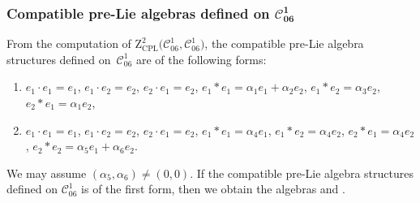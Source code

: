 \documentclass[10pt,a4paper]{amsart}
\numberwithin{equation}{section}
\begin{document}
\subsubsection[Compatible pre-Lie algebras defined on C\_\{06\}\^{}1]{Compatible pre-Lie algebras defined on $\boldsymbol{\mathcal{C}_{06}^{1}}$}

From the computation of $\mathrm{Z}_{\mathrm{CPL}}^{2}\bigl(\mathcal{C}_{06}^{1},%
\mathcal{C}_{06}^{1}\bigr)$, the compatible pre-Lie algebra structures defined on~$\mathcal{C}_{06}^{1}$ are of the following forms:
\begin{enumerate}\itemsep=0pt
\item[(1)] $e_{1}\cdot e_{1}=e_{1}$, $e_{1}\cdot e_{2}=e_{2}$, $e_{2}\cdot
e_{1}=e_{2}$,
$e_{1}\ast e_{1}=\alpha _{1}e_{1}+\alpha _{2}e_{2}$, $e_{1}\ast
e_{2}=\alpha _{3}e_{2}$, $e_{2}\ast e_{1}=\alpha _{1}e_{2}$,

\item[(2)] $e_{1}\cdot e_{1}=e_{1}$, $e_{1}\cdot e_{2}=e_{2}$, $e_{2}\cdot
e_{1}=e_{2}$,
$e_{1}\ast e_{1}=\alpha _{4}e_{1}$, $e_{1}\ast e_{2}=\alpha _{4}e_{2}$, $%
e_{2}\ast e_{1}=\alpha _{4}e_{2}$, $e_{2}\ast e_{2}=\alpha
_{5}e_{1}+\alpha _{6}e_{2}$.
\end{enumerate}

We may assume $( \alpha _{5},\alpha _{6}) \neq ( 0,0) $.
If the compatible pre-Lie algebra structures defined on $\mathcal{C}%
_{06}^{1}$ is of the first form, then we obtain the algebras  and .
\end{document}
